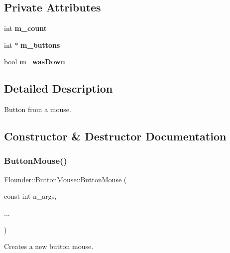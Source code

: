 \subsection*{Private Attributes}
\begin{DoxyCompactItemize}
\item 
\mbox{\label{class_flounder_1_1_button_mouse_a115960fb31300a9f63ca8d904c8667a3}} 
int {\bfseries m\+\_\+count}
\item 
\mbox{\label{class_flounder_1_1_button_mouse_a86470f423153f42c0c6dd2032ee41dbe}} 
int $\ast$ {\bfseries m\+\_\+buttons}
\item 
\mbox{\label{class_flounder_1_1_button_mouse_adef425aef45c115347f705f385ddf7e3}} 
bool {\bfseries m\+\_\+was\+Down}
\end{DoxyCompactItemize}


\subsection{Detailed Description}
Button from a mouse. 



\subsection{Constructor \& Destructor Documentation}
\mbox{\label{class_flounder_1_1_button_mouse_a88a82b1feb4c10ea48349ddb4eeb3f7b}} 
\subsubsection{\texorpdfstring{Button\+Mouse()}{ButtonMouse()}}
{\footnotesize\ttfamily Flounder\+::\+Button\+Mouse\+::\+Button\+Mouse (\begin{DoxyParamCaption}\item[{const int}]{n\+\_\+args,  }\item[{}]{... }\end{DoxyParamCaption})}



Creates a new button mouse. 


